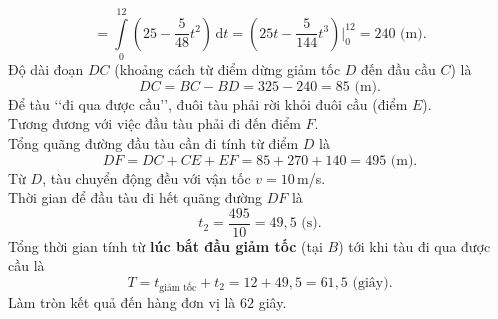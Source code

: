 \begin{ex}
{\begin{itemchoice}
\[			=\displaystyle\int\limits_0^{12} \left(25-\dfrac{5}{48}t^2 \right)\mathrm{\,d}t
			=\left(25t-\dfrac{5}{144}t^3\right) \Bigg|_0^{12}
			=240 \text{ (m)}.\]
			Độ dài đoạn $DC$ (khoảng cách từ điểm dừng giảm tốc $D$ đến đầu cầu $C$) là
			\[DC=BC-BD=325-240=85 \text{ (m)}.\]
			\itemch 
			Để tàu \lq\lq đi qua được cầu\rq\rq, đuôi tàu phải rời khỏi đuôi cầu (điểm $E$).\\ Tương đương với việc đầu tàu phải đi đến điểm $F$.\\
			Tổng quãng đường đầu tàu cần đi tính từ điểm $D$ là
			\[DF = DC+CE+EF=85+270+140=495 \text{ (m)}.\]
			Từ $D$, tàu chuyển động đều với vận tốc $v=10$\,m/s.\\ Thời gian để đầu tàu đi hết quãng đường $DF$ là
			\[t_2=\dfrac{495}{10}=49{,}5 \text{ (s)}.\]
			Tổng thời gian tính từ \textbf{lúc bắt đầu giảm tốc} (tại $B$) tới khi tàu đi qua được cầu là
			\[T = t_{\text{giảm tốc}} + t_2 = 12 + 49{,}5 = 61{,}5 \text{ (giây)}.\]
			Làm tròn kết quả đến hàng đơn vị là $62$ giây.
		\end{itemchoice}
	}
\end{ex}

